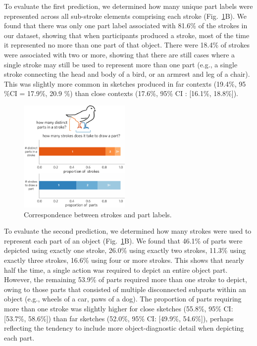 \documentclass[10pt,letterpaper]{article}
\newcommand{\jefan}[1]{{\color{blue}{[jefan: #1]}}}
\begin{document}
To evaluate the first prediction, we determined how many unique part labels were represented across all sub-stroke elements comprising each stroke (Fig.~\ref{stroke_to_part}B). 
We found that there was only one part label associated with 81.6\% of the strokes in our dataset, showing that when participants produced a stroke, most of the time it represented no more than one part of that object. 
There were 18.4\% of strokes were associated with two or more, showing that there are still cases where a single stroke may still be used to represent more than one part (e.g., a single stroke connecting the head and body of a bird, or an armrest and leg of a chair). 
This was slightly more common in sketches produced in far contexts (19.4\%, 95 \%CI = 17.9\%, 20.9 \%) than close contexts (17.6\%, 95\% CI : [16.1\%, 18.8\%]). 

\begin{figure}[htbp]
\centering
\includegraphics[width=0.48\textwidth]{figures/5_stroke_part_relationship.pdf}
\caption{Correspondence between strokes and part labels.}
\label{stroke_to_part}
\end{figure}

To evaluate the second prediction, we determined how many strokes were used to represent each part of an object (Fig.~\ref{stroke_to_part}B). 
We found that 46.1\% of parts were depicted using exactly one stroke, 26.0\% using exactly two strokes, 11.3\% using exactly three strokes, 16.6\% using four or more strokes. 
This shows that nearly half the time, a single action was required to depict an entire object part. 
However, the remaining 53.9\% of parts required more than one stroke to depict, owing to those parts that consisted of multiple disconnected subparts within an object (e.g., wheels of a car, paws of a dog).
\jefan{This should be verified in some way by subsetting on those feature columns that actually are likely to contain multiple instances per object.}
The proportion of parts requiring more than one stroke was slightly higher for close sketches (55.8\%, 95\% CI: [53.7\%, 58.6\%]) than far sketches (52.0\%, 95\% CI: [49.9\%, 54.6\%]), perhaps reflecting the tendency to include more object-diagnostic detail when depicting each part. 
\end{document}
